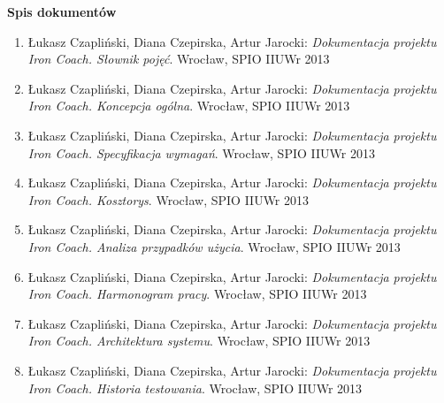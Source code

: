 

\begin{center}
\end{center}

\newcommand{\quickbib}[1]{\item Łukasz Czapliński, Diana Czepirska, Artur Jarocki: {\it Dokumentacja projektu Iron Coach. #1}. Wrocław, SPIO IIUWr 2013}

\vspace*{1cm}
{\textbf{\Large{Spis dokumentów}}}\vspace{0.5cm}
\large
\begin{enumerate}\itemsep5pt
      \quickbib{Słownik pojęć}
      \quickbib{Koncepcja ogólna}
      \quickbib{Specyfikacja wymagań}
      \quickbib{Kosztorys}
      \quickbib{Analiza przypadków użycia}
      \quickbib{Harmonogram pracy}
      \quickbib{Architektura systemu}
      \quickbib{Historia testowania}
\end{enumerate}
\vfill


